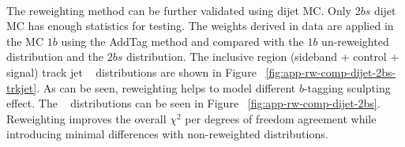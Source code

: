 \paragraph{}
The reweighting method can be further validated using dijet MC. 
Only $2bs$ dijet MC has enough statistics for testing. 
The weights derived in data are applied in the MC $1b$ using the AddTag method and compared with the $1b$ un-reweighted distribution and the $2bs$ distribution. 
The inclusive region (sideband + control + signal) track jet \pt~ distributions are shown in Figure ~\ref{fig:app-rw-comp-dijet-2bs-trkjet}. 
As can be seen, reweighting helps to model different $b$-tagging sculpting effect. 
The \mtwoJ~ distributions can be seen in Figure ~\ref{fig:app-rw-comp-dijet-2bs}. 
Reweighting improves the overall $\chi^2$ per degrees of freedom agreement while introducing minimal differences with non-reweighted distributions.

